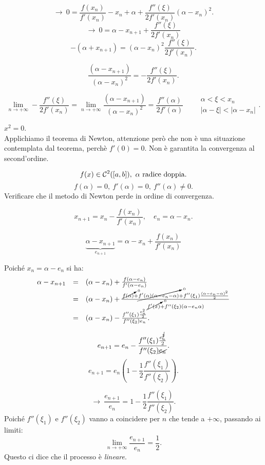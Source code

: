 \begin{dimo}
\[\longrightarrow \
0 = \frac{f(x_n)}{f'(x_n)} - x_n + \alpha + \frac{f''(\xi)}{2f'(x_n)}
(\alpha - x_n)^2.
\]
\[\longrightarrow \
0 = \alpha - x_{n+1} + \frac{f''(\xi)}{2f'(x_n)}
\]
\[
- (\alpha + x_{n+1}) = (\alpha -x_n)^2\frac{f''(\xi)}{2f'(x_n)}.
\]

\[
\frac{(\alpha -x_{n+1})}{(\alpha -x_n)^2} = -\frac{f''(\xi)}{2f'(x_n)}.
\]

\[
\lim_{n \to + \infty}-\frac{f''(\xi)}{2f'(x_n)} = \lim_{n \to + \infty}
\frac{(\alpha -x_{n+1})}{(\alpha -x_n)^2} = \frac{f''(\alpha)}{2 f'(\alpha)} 
\qquad 
\substack{\alpha < \xi < x_n \\ |\alpha - \xi| < |\alpha - x_n|}.
\]
\end{dimo}

\begin{ese}
$x^2 = 0$.\\

Applichiamo il teorema di Newton, attenzione però che non è una situazione 
contemplata dal teorema, perchè $f'(0) =0$. Non è garantita la convergenza 
al second'ordine.

\[
f(x) \in \cc^2([a,b]), \ \alpha \ \textrm{radice doppia.}
\]
\[
f(\alpha) = 0, \ f'(\alpha) = 0, \ f''(\alpha) \neq 0.
\]
Verificare che il metodo di Newton perde in ordine di convergenza.

\[x_{n+1} = x_n - \frac{f(x_n)}{f'(x_n)}, \quad e_n = \alpha - x_n.\]

\[
\underbrace{\alpha - x_{n+1}}_{e_{n+1}} = \alpha -x_n + \frac{f(x_n)}{f'(x_n)}
\]

Poiché $x_n = \alpha -e_n$ si ha:
\[\begin{array}{lcl}
\alpha - x_{n+1} & = & (\alpha - x_n) + 
                      \frac{f(\alpha - e_n)}{f'(\alpha - e_n)} \\
& = & (\alpha - x_n) + \frac{\cancelto{0}{f(\alpha)}+ \cancelto{0}{f'(\alpha)(\alpha - 
e_n -\alpha)} + f''(\xi_1)\frac{(\alpha-e_n-\alpha)^2}{2}}{\cancelto{0}{f'(x)}
 + f''(\xi_2)(\alpha -e_n \alpha)} \\
& = & (\alpha - x_n) - \frac{f''(\xi_1)\frac{e_n^2}{2}}{f''(\xi_2)e_n}.
\end{array}
\]

\[
e_{n+1} = e_n-\frac{f''(\xi_1)\frac{e_n^{\cancel{2}}}{2}}{f''(\xi_2)\cancel{e_n}}.
\]
\[
e_{n+1} = e_n \left(1 - \frac{1}{2}\frac{f''(\xi_1)}{f''(\xi_2)}\right).
\]

\[\longrightarrow \
\frac{e_{n+1}}{ e_n} = 1 - \frac{1}{2}\frac{f''(\xi_1)}{f''(\xi_2)}.
\]
Poiché $f''(\xi_1)$ e $f''(\xi_2)$ vanno a coincidere per $n$ che tende a
$+ \infty$, passando ai limiti:
\[
\lim_{n \to + \infty}\frac{e_{n+1}}{ e_n} = \frac{1}{2}.
\]
Questo ci dice che il processo è \emph{lineare}.
\end{ese}
